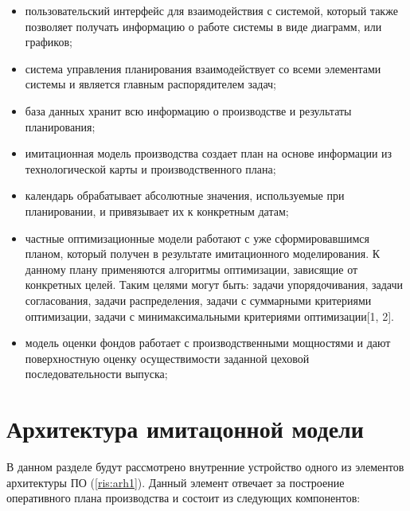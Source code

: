\begin{itemize}
    \item пользовательский интерфейс для взаимодействия с системой, который также позволяет получать информацию о работе системы в виде диаграмм, или графиков; 
    \item система управления планирования взаимодействует со всеми элементами системы и является главным распорядителем задач;
    \item база данных хранит всю информацию о производстве и результаты планирования; 
    \item имитационная модель производства создает план на основе информации из технологической карты и производственного плана;
    \item календарь обрабатывает абсолютные значения, используемые при планировании, и привязывает их к конкретным датам;
    \item частные оптимизационные модели работают с уже сформировавшимся планом, который получен в результате имитационного моделирования. К данному плану применяются алгоритмы оптимизации, зависящие от конкретных целей. Таким целями могут быть: задачи упорядочивания, задачи согласования, задачи распределения, задачи с суммарными критериями оптимизации, задачи с минимаксимальными критериями оптимизации[1, 2].
    \item модель оценки фондов работает с производственными мощностями и дают поверхностную оценку осуществимости заданной цеховой последовательности выпуска;
\end{itemize}

\section{Архитектура имитацонной модели}
В данном разделе будут рассмотрено внутренние устройство одного из элементов архитектуры ПО (\ref{ris:arh1}). 
Данный элемент отвечает за построение оперативного плана производства и состоит из следующих компонентов:

